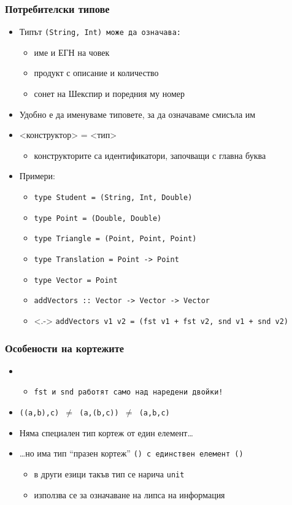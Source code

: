 \documentclass{beamer}
\begin{document}
\begin{frame}
  \frametitle{Потребителски типове}
  \begin{itemize}[<+->]
  \item Типът \tt{(String, Int)} може да означава:
    \begin{itemize}
    \item име и ЕГН на човек
    \item продукт с описание и количество
    \item сонет на Шекспир и поредния му номер 
    \end{itemize}
  \item Удобно е да именуваме типовете, за да означаваме смисъла им
  \item {}<конструктор> \tta= <тип>
    \begin{itemize}
    \item конструкторите са идентификатори, започващи с главна буква
    \end{itemize}
  \item Примери:
    \begin{itemize}
    \item \tt{type Student = (String, Int, Double)}
    \item \tt{type Point = (Double, Double)}
    \item \tt{type Triangle = (Point, Point, Point)}
    \item \tt{type Translation = Point -> Point}
    \item \tt{type Vector = Point}
    \item \tt{addVectors :: Vector -> Vector -> Vector}
    \item<.-> \tt{addVectors v1 v2 = (fst v1 + fst v2, snd v1 + snd v2)}
    \end{itemize}
  \end{itemize}
\end{frame}

\begin{frame}
  \frametitle{Особености на кортежите}
  \begin{itemize}[<+->]
  \item {}
    \begin{itemize}
    \item \tt{fst} и \tt{snd} работят само над наредени двойки!
    \end{itemize}
  \item \tt{((a,b),c)} $\neq$ \tt{(a,(b,c))} $\neq$ \tt{(a,b,c)}
  \item Няма специален тип кортеж от един елемент\ldots
  \item \ldots но има тип ``празен кортеж'' \tt{()} с единствен елемент \tt{()}
    \begin{itemize}
    \item в други езици такъв тип се нарича \tt{unit}
    \item използва се за означаване на липса на информация
    \end{itemize}
  \end{itemize}
\end{frame}
\end{document}
